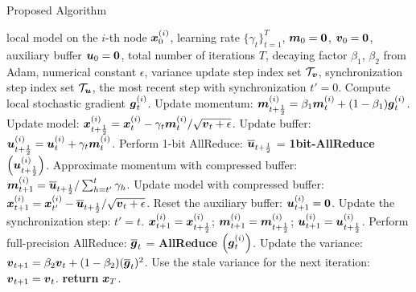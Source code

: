 \begin{algorithm}[t!]
\small
	\caption{Proposed {\myalgo} Algorithm}\label{algo:localstep01}
	\begin{algorithmic}[1]
		\Require local model on the $i$-th node $\boldsymbol{x}^{(i)}_{0}$, learning rate $\{\gamma_t\}_{t=1}^{T}$, $\boldsymbol{m}_0=\boldsymbol{0}$, $\boldsymbol{v}_0=\boldsymbol{0}$, auxiliary buffer $\boldsymbol{u}_0=\boldsymbol{0}$, total number of iterations $T$, decaying factor $\beta_1$, $\beta_2$ from Adam, numerical constant $\epsilon$, variance update step index set $\mathcal{T}_{\boldsymbol{v}}$, synchronization step index set $\mathcal{T}_{\boldsymbol{u}}$, the most recent step with synchronization $t'=0$.
		    \State Compute local stochastic gradient $\boldsymbol{g}^{(i)}_t$.
		    \State Update momentum: $\boldsymbol{m}^{(i)}_{t+\frac{1}{2}} = \beta_1\boldsymbol{m}^{(i)}_{t} + (1-\beta_1){\boldsymbol{g}}^{(i)}_t$.
		    \State Update model: $\boldsymbol{x}^{(i)}_{t+\frac{1}{2}} = \boldsymbol{x}^{(i)}_{t} - \gamma_t{\boldsymbol{m}}^{(i)}_t/\sqrt{\boldsymbol{v}_t+\epsilon}$.
		    \State Update buffer: $\boldsymbol{u}^{(i)}_{t+\frac{1}{2}} = \boldsymbol{u}^{(i)}_{t} + \gamma_t{\boldsymbol{m}}^{(i)}_t$.
    		    \State Perform 1-bit AllReduce: $\overline{\boldsymbol{u}}_{t+\frac{1}{2}}$ = \textbf{1bit-AllReduce} $\left(\boldsymbol{u}_{t+\frac{1}{2}}^{(i)}\right)$.
    		    \State Approximate momentum with compressed buffer: $\boldsymbol{m}^{(i)}_{t+1} = \overline{\boldsymbol{u}}_{t+\frac{1}{2}}/\sum_{h=t'}^{t}\gamma_h$.
    		    \State Update model with compressed buffer: $\boldsymbol{x}^{(i)}_{t+1} = \boldsymbol{x}^{(i)}_{t'} - \overline{\boldsymbol{u}}_{t+\frac{1}{2}}/\sqrt{\boldsymbol{v}_t+\epsilon}$.
    		    \State Reset the auxiliary buffer: $\boldsymbol{u}^{(i)}_{t+1} = \boldsymbol{0}$.
    		    \State Update the synchronization step: $t'=t$.
    		\Else
    		    \State  $\boldsymbol{x}^{(i)}_{t+1}=\boldsymbol{x}^{(i)}_{t+\frac{1}{2}}$; $\boldsymbol{m}^{(i)}_{t+1}=\boldsymbol{m}^{(i)}_{t+\frac{1}{2}}$; $\boldsymbol{u}^{(i)}_{t+1}=\boldsymbol{u}^{(i)}_{t+\frac{1}{2}}$.
    	    \EndIf
		        \State Perform full-precision AllReduce: $\overline{\boldsymbol{g}}_t$ = \textbf{AllReduce} $\left(\boldsymbol{g}_t^{(i)}\right)$.
		        \State Update the variance: $\boldsymbol{v}_{t+1} = \beta_2\boldsymbol{v}_{t} + (1-\beta_2)(\overline{\boldsymbol{g}}_t)^2$.
		    \Else
		        \State Use the stale variance for the next iteration: $\boldsymbol{v}_{t+1} = \boldsymbol{v}_{t}$.
		    \EndIf
		\EndFor
		\State \textbf{return} $\boldsymbol{x}_T$.
	\end{algorithmic}
\end{algorithm}

